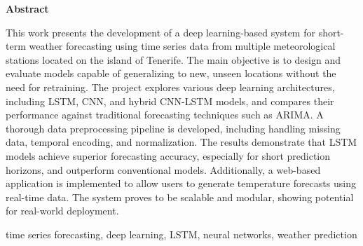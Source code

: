 \documentclass[spanish,a4paper,12pt,oneside]{extreport}
\newenvironment{summary}
{\par\noindent\begin{center}\textbf{Abstract}\end{center}\begin{itshape}\par\noindent}
{\end{itshape}}
\newenvironment{keywords}
{\begin{list}{}{\setlength{\leftmargin}{1em}}\item[\hskip\labelsep \bfseries Keywords:]}
{\end{list}}
\begin{document}
\begin{summary}
{
This work presents the development of a deep learning-based system for short-term weather forecasting using time series data from multiple meteorological stations located on the island of Tenerife. The main objective is to design and evaluate models capable of generalizing to new, unseen locations without the need for retraining. The project explores various deep learning architectures, including LSTM, CNN, and hybrid CNN-LSTM models, and compares their performance against traditional forecasting techniques such as ARIMA. A thorough data preprocessing pipeline is developed, including handling missing data, temporal encoding, and normalization. The results demonstrate that LSTM models achieve superior forecasting accuracy, especially for short prediction horizons, and outperform conventional models. Additionally, a web-based application is implemented to allow users to generate temperature forecasts using real-time data. The system proves to be scalable and modular, showing potential for real-world deployment.
}

\em
\begin {keywords}
time series forecasting, deep learning, LSTM, neural networks, weather prediction
\end {keywords}

\end{summary}
\newpage{\pagestyle{empty}}
\thispagestyle{empty}

\pagestyle{myheadings} %



\renewcommand{\thepage}{\roman{page}}
\setcounter{page}{1}
\pagestyle{plain} 


\tableofcontents

\newpage{\pagestyle{empty}}

\listoffigures

\newpage{\pagestyle{empty}}
\end{document}
